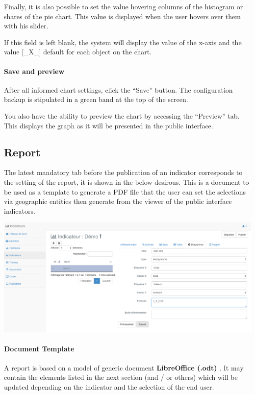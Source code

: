 \documentclass[letterpaper,10pt,english]{sphinxmanual}
\begin{document}
Finally, it is also possible to set the value hovering columns of the histogram or shares of the pie chart. This value is displayed when the user hovers over them with his slider.

If this field is left blank, the system will display the value of the x-axis and the value {[}\_X\_{]} default for each object on the chart.
\paragraph{Save and preview}

After all informed chart settings, click the ``Save'' button. The configuration backup is stipulated in a green band at the top of the screen.

You also have the ability to preview the chart by accessing the ``Preview'' tab. This displays the graph as it will be presented in the public interface.


\subsection{Report}
\label{indicators/indicatorspanel:rapport}
The latest mandatory tab before the publication of an indicator corresponds to the setting of the report, it is shown in the below desirous. This is a document to be used as a template to generate a PDF file that the user can set the selections via geographic entities then generate from the viewer of the public interface indicators.

\includegraphics[width=1.000\linewidth]{indicator-graph.png}
\paragraph{Document Template}

A report is based on a model of generic document \textbf{LibreOffice (.odt)} . It may contain the elements listed in the next section (and / or others) which will be updated depending on the indicator and the selection of the end user.
\end{document}
